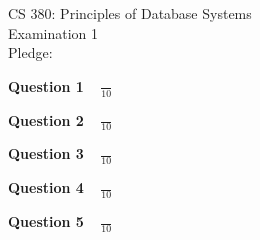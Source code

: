 \documentclass[12pt]{article}
\begin{document}
\pagestyle{empty}

\vspace*{3in}

\begin{center}

CS 380: Principles of Database Systems \\
Examination 1 \\
Pledge: \\

\end{center}

\newpage

{\bf Question 1} {\Large $\;\;\;\frac{}{10}$ }

\newpage

{\bf Question 2} {\Large $\;\;\; \frac{}{10}$ }

\newpage

{\bf Question 3} {\Large $\;\;\; \frac{}{10}$ }

\newpage

{\bf Question 4} {\Large $\;\;\; \frac{}{10}$ }

\newpage

{\bf Question 5} {\Large $\;\;\; \frac{}{10}$ }
\end{document}
